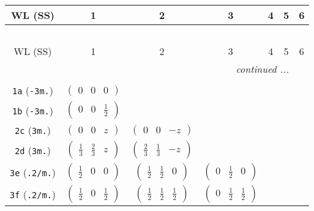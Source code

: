 \documentclass[fleqn,9pt,landscape]{jsarticle}
\begin{document}
\begin{center}
\renewcommand{\arraystretch}{1.2}
\begin{longtable}{ccccccc}
 \hline \hline
WL (SS) & 1 & 2 & 3 & 4 & 5 & 6 \\ \hline \endfirsthead

\multicolumn{6}{l}{\tablename\ \thetable{}} \\
 \hline \hline
WL (SS) & 1 & 2 & 3 & 4 & 5 & 6 \\ \hline \endhead

 \hline \hline
\multicolumn{6}{r}{\footnotesize\it continued ...} \\ \endfoot

 \hline \hline
\multicolumn{6}{r}{} \\ \endlastfoot

{\tt 1a} ({\tt -3m.}) & $ \begin{pmatrix} 0 & 0 & 0 \end{pmatrix} $ & $  $ & $  $ & $  $ & $  $ & $  $ \\ \hline
{\tt 1b} ({\tt -3m.}) & $ \begin{pmatrix} 0 & 0 & \frac{1}{2} \end{pmatrix} $ & $  $ & $  $ & $  $ & $  $ & $  $ \\ \hline
{\tt 2c} ({\tt 3m.}) & $ \begin{pmatrix} 0 & 0 & z \end{pmatrix} $ & $ \begin{pmatrix} 0 & 0 & - z \end{pmatrix} $ & $  $ & $  $ & $  $ & $  $ \\ \hline
{\tt 2d} ({\tt 3m.}) & $ \begin{pmatrix} \frac{1}{3} & \frac{2}{3} & z \end{pmatrix} $ & $ \begin{pmatrix} \frac{2}{3} & \frac{1}{3} & - z \end{pmatrix} $ & $  $ & $  $ & $  $ & $  $ \\ \hline
{\tt 3e} ({\tt .2/m.}) & $ \begin{pmatrix} \frac{1}{2} & 0 & 0 \end{pmatrix} $ & $ \begin{pmatrix} \frac{1}{2} & \frac{1}{2} & 0 \end{pmatrix} $ & $ \begin{pmatrix} 0 & \frac{1}{2} & 0 \end{pmatrix} $ & $  $ & $  $ & $  $ \\ \hline
{\tt 3f} ({\tt .2/m.}) & $ \begin{pmatrix} \frac{1}{2} & 0 & \frac{1}{2} \end{pmatrix} $ & $ \begin{pmatrix} \frac{1}{2} & \frac{1}{2} & \frac{1}{2} \end{pmatrix} $ & $ \begin{pmatrix} 0 & \frac{1}{2} & \frac{1}{2} \end{pmatrix} $ & $  $ & $  $ & $  $ \\ \hline

\end{longtable}
\end{center}
\end{document}
